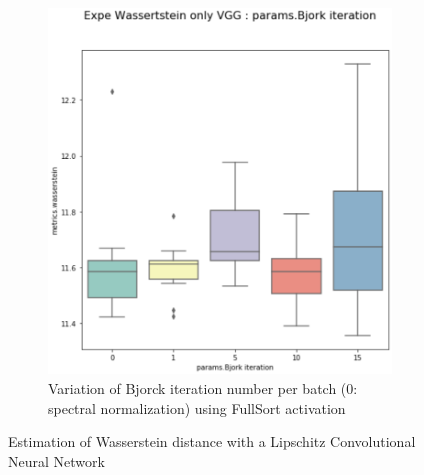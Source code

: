 \begin{figure}
\begin{subfigure}{.5\textwidth}
  \includegraphics[width=1\linewidth]{img/Wassertein_estimation_VGG_bjorck_param.png}
  \caption{Variation of Bjorck iteration number per batch (0: spectral normalization) using FullSort activation}
  \label{fig:batch_sub2}
\end{subfigure}
\caption{Estimation of Wasserstein distance with a Lipschitz Convolutional Neural Network}
\label{fig:wass_estimation_cnn}
\end{figure}





